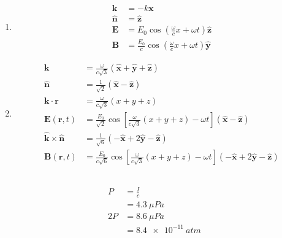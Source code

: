 \documentclass{article}
\renewcommand{\vec}[1]{\boldsymbol{\mathbf{#1}}}
\newcommand{\uvec}[1]{\hat{\vec{#1}}}
\begin{document}
\begin{enumerate}
  \item

        \begin{align*}
          \vec{k}  & = -k \vec{x}                                                               \\
          \uvec{n} & = \uvec{z}                                                                 \\
          \vec{E}  & = E_0 \cos \left( \frac{\omega}{c} x + \omega t \right) \uvec{z}           \\
          \vec{B}  & = \frac{E_0}{c} \cos \left( \frac{\omega}{c} x + \omega t \right) \uvec{y}
        \end{align*}

  \item

        \begin{align*}
          \vec{k}                  & = \frac{\omega}{c \sqrt{3}} (\uvec{x} + \uvec{y} + \uvec{z})                                                                      \\
          \uvec{n}                 & = \frac{1}{\sqrt{2}} (\uvec{x} - \uvec{z})                                                                                        \\
          \vec{k} \cdot \vec{r}    & = \frac{\omega}{c \sqrt{3}} (x + y + z)                                                                                           \\
          \vec{E}(\vec{r}, t)      & = \frac{E_0}{\sqrt{2}} \cos \left[ \frac{\omega}{c \sqrt{3}} (x + y + z) - \omega t \right] (\uvec{x} - \uvec{z})                 \\
          \uvec{k} \times \uvec{n} & = \frac{1}{\sqrt{6}} (-\uvec{x} + 2 \uvec{y} - \uvec{z})                                                                          \\
          \vec{B}(\vec{r}, t)      & = \frac{E_0}{c \sqrt{6}} \cos \left[ \frac{\omega}{c \sqrt{3}} (x + y + z) - \omega t \right] (-\uvec{x} + 2 \uvec{y} - \uvec{z})
        \end{align*}
\end{enumerate}

\subsection{}

\begin{align*}
  P   & = \frac{I}{c}        \\
      & = \qty{4.3}{\mu Pa}  \\
  2 P & = \qty{8.6}{\mu Pa}  \\
      & = \qty{8.4e-11}{atm}
\end{align*}
\end{document}
